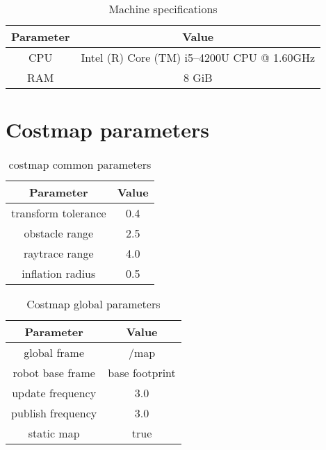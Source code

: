 \begin{table}[H]
    \centering
    \begin{tabular}{cc}
    \textbf{Parameter} & \textbf{Value} \\\toprule
    CPU & Intel (R) Core (TM) i5--4200U CPU @ 1.60GHz \\
    RAM & 8 GiB \\
    \end{tabular}
    \caption{Machine specifications}\label{tab:machine_specifications}
\end{table}

\section{Costmap parameters}%
\label{sec:costmap_parameters}

\begin{table}[H]
    \centering
    \begin{tabular}{cc}
    \textbf{Parameter} & \textbf{Value} \\\toprule
    transform tolerance & 0.4\\
    obstacle range & 2.5\\
    raytrace range & 4.0\\
    inflation radius & 0.5\\
    \end{tabular}
    \caption{costmap common parameters}\label{tab:costmap_common}
\end{table}


\begin{table}[H]
    \centering
    \begin{tabular}{cc}
    \textbf{Parameter} & \textbf{Value} \\\toprule
    global frame & /map\\
    robot base frame & base footprint\\
    update frequency & 3.0\\
    publish frequency & 3.0\\
    static map & true\\
    \end{tabular}
    \caption{Costmap global parameters}\label{tab:costmap_global}
\end{table}

